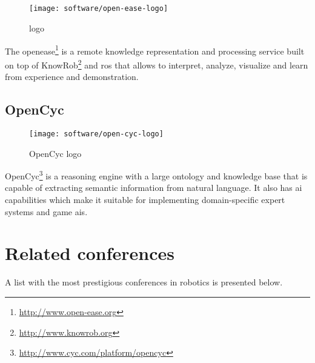\subsection{}

\begin{wrapfigure}{r}{0.23\textwidth}
	\centering
	\vspace*{-2em}
	\texttt{[image: software/open-ease-logo]}
	\caption{ logo}
	\label{fig:open-ease}
\end{wrapfigure}

The \gls{openease}\footnote{\url{http://www.open-ease.org}} \cite{Beetz2015} is a remote knowledge representation and processing service built on top of KnowRob\footnote{\url{http://www.knowrob.org}} and \gls{ros} that allows to interpret, analyze, visualize and learn from experience and demonstration.


\subsection{OpenCyc}

\begin{wrapfigure}{r}{0.23\textwidth}
	\centering
	\vspace*{-2em}
	\texttt{[image: software/open-cyc-logo]}
	\caption{OpenCyc logo}
	\label{fig:open-cyc}
\end{wrapfigure}

OpenCyc\footnote{\url{http://www.cyc.com/platform/opencyc}} is a reasoning engine with a large ontology and knowledge base that is capable of extracting semantic information from natural language. It also has \gls{ai} capabilities which make it suitable for implementing domain-specific expert systems and game \glspl{ai}.



\section{Related conferences}

A list with the most prestigious conferences in robotics is presented below.

